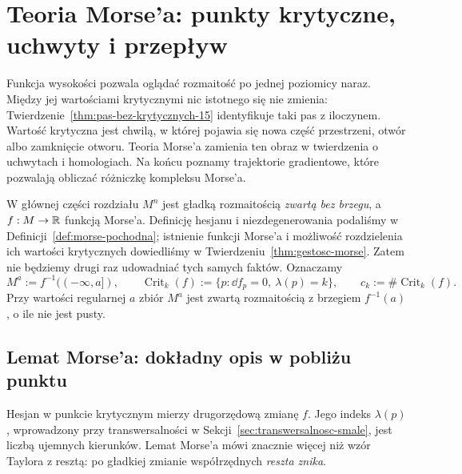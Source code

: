 \chapter{Teoria Morse'a: punkty krytyczne, uchwyty i przepływ}
\label{ch:teoria-morsea}

Funkcja wysokości pozwala oglądać rozmaitość
po jednej poziomicy naraz. Między jej wartościami
krytycznymi nic istotnego się nie zmienia:
Twierdzenie~\ref{thm:pas-bez-krytycznych-15}
identyfikuje taki pas z iloczynem.
Wartość krytyczna jest chwilą, w której
pojawia się nowa część przestrzeni, otwór
albo zamknięcie otworu. Teoria Morse'a
zamienia ten obraz w twierdzenia o uchwytach
i homologiach. Na końcu poznamy trajektorie
gradientowe, które pozwalają obliczać różniczkę
kompleksu Morse'a.

W głównej części rozdziału $M^n$ jest gładką
rozmaitością \emph{zwartą bez brzegu}, a $f:M\to\mathbb{R}$
funkcją Morse'a. Definicję hesjanu
i niezdegenerowania podaliśmy w
Definicji~\ref{def:morse-pochodna}; istnienie
funkcji Morse'a i możliwość rozdzielenia
ich wartości krytycznych dowiedliśmy w
Twierdzeniu~\ref{thm:gestosc-morse}.
Zatem nie będziemy drugi raz udowadniać
tych samych faktów. Oznaczamy
\[
 M^a:=f^{-1}((-\infty,a]),\qquad
 \operatorname{Crit}_k(f)
  :=\{p:\dd f_p=0,\ \lambda(p)=k\},
 \qquad c_k:=\#\operatorname{Crit}_k(f).
\]
Przy wartości regularnej $a$ zbiór $M^a$
jest zwartą rozmaitością z brzegiem
$f^{-1}(a)$, o ile nie jest pusty.

\section{Lemat Morse'a: dokładny opis w pobliżu punktu}
\label{sec:lemat-morsea-17}

Hesjan w punkcie krytycznym mierzy
drugorzędową zmianę $f$. Jego indeks
$\lambda(p)$, wprowadzony przy
transwersalności w
Sekcji~\ref{sec:transwersalnosc-smale},
jest liczbą ujemnych kierunków.
Lemat Morse'a mówi znacznie więcej
niż wzór Taylora z resztą: po gładkiej
zmianie współrzędnych \emph{reszta znika}.

